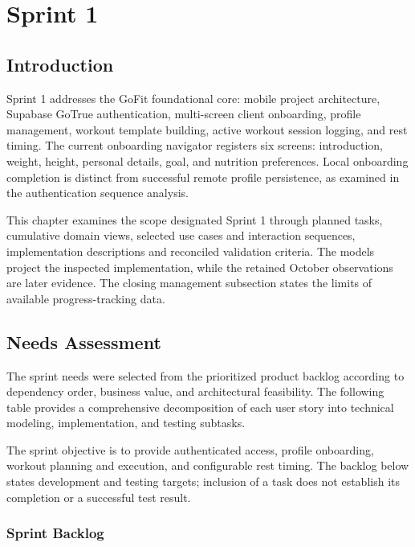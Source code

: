 \documentclass[12pt,a4paper,openany]{report}
\begin{document}
\chapter{Sprint 1}


\section*{Introduction}

Sprint 1 addresses the GoFit foundational core: mobile project architecture, Supabase GoTrue authentication, multi-screen client onboarding, profile management, workout template building, active workout session logging, and rest timing. The current onboarding navigator registers six screens: introduction, weight, height, personal details, goal, and nutrition preferences. Local onboarding completion is distinct from successful remote profile persistence, as examined in the authentication sequence analysis.


This chapter examines the scope designated Sprint 1 through planned tasks, cumulative domain views, selected use cases and interaction sequences, implementation descriptions and reconciled validation criteria. The models project the inspected implementation, while the retained October observations are later evidence. The closing management subsection states the limits of available progress-tracking data.


\section{Needs Assessment}

The sprint needs were selected from the prioritized product backlog according to dependency order, business value, and architectural feasibility. The following table provides a comprehensive decomposition of each user story into technical modeling, implementation, and testing subtasks.


The sprint objective is to provide authenticated access, profile onboarding, workout planning and execution, and configurable rest timing. The backlog below states development and testing targets; inclusion of a task does not establish its completion or a successful test result.


\subsection{Sprint Backlog}
\end{document}
